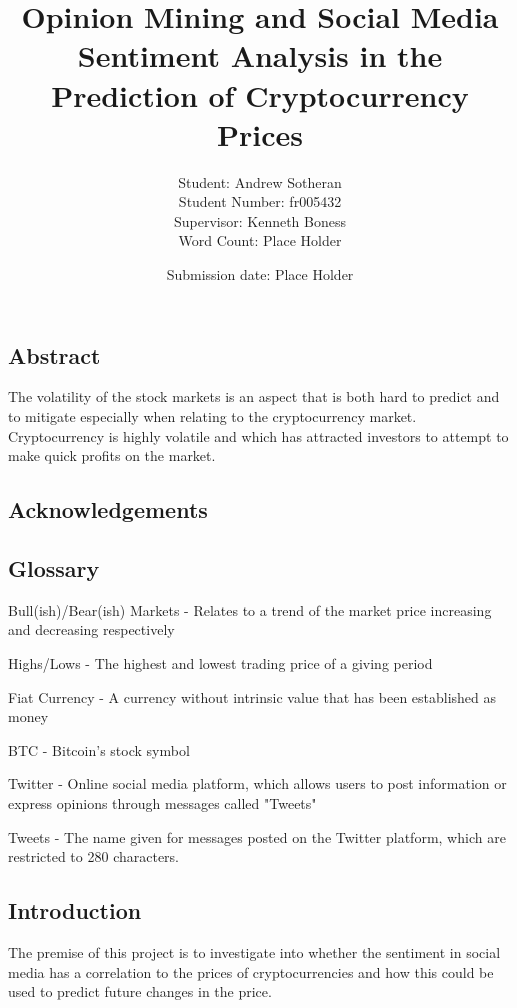 \documentclass[oneside, 10pt]{article}
\title{Opinion Mining and Social Media Sentiment Analysis in the Prediction of Cryptocurrency Prices}
\date{Submission date: Place Holder}
\author{Student: Andrew Sotheran
	\\Student Number: fr005432
	\\Supervisor: Kenneth Boness
	\\Word Count: Place Holder}
\begin{document}
	
	\maketitle
	
	\vspace*{\fill}
	\begin{center}
		\section{Abstract}\label{abstract}
	\end{center}
		The volatility of the stock markets is an aspect that is both hard to predict and to mitigate especially when relating to the cryptocurrency market. Cryptocurrency is highly volatile and which has attracted investors to attempt to make quick profits on the market.

	
	\newpage
	\begin{center}
		\section{Acknowledgements}\label{acknowledgements}
	\end{center}
	
	\newpage
	\begin{center}
		\section{Glossary}\label{glossary}
	\end{center}
	Bull(ish)/Bear(ish) Markets - Relates to a trend of the market price increasing and decreasing respectively
	
	Highs/Lows - The highest and lowest trading price of a giving period
	
	Fiat Currency - A currency without intrinsic value that has been established as money
	
	BTC - Bitcoin's stock symbol
	
	Twitter - Online social media platform, which allows users to post information or express opinions through messages called "Tweets"
	
	Tweets - The name given for messages posted on the Twitter platform, which are restricted to 280 characters.
	
	\newpage
	
	\begin{center}
		\tableofcontents
	\end{center}
	
	\newpage
	\begin{center}
		\section{Introduction}\label{introduction}
	\end{center}
	The premise of this project is to investigate into whether the sentiment in social media has a correlation to the prices of cryptocurrencies and how this could be used to predict future changes in the price. 
	
\end{document}
